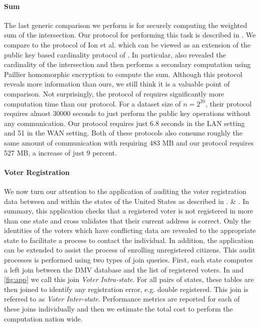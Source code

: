 \paragraph{Sum} The last generic comparison we perform is for securely computing the weighted sum of the intersection. Our protocol for performing this task is described in . We compare to the protocol of Ion et al. \cite{cryptoeprint:2017:738} which can be viewed as an extension of the public key based cardinality protocol of \cite{DBLP:conf/cans/CristofaroGT12}. In particular, \cite{cryptoeprint:2017:738}  also revealed the cardinality of the intersection and then performs a secondary computation using Paillier homomorphic encryption to compute the sum. Although this protocol reveals more information than ours, we still think it is a valuable point of comparison. Not surprisingly,  the protocol of \cite{cryptoeprint:2017:738} requires significantly more computation time than our protocol. For a dataset size of $n=2^{20}$, their protocol requires almost 30000 seconds to just perform the public key operations without any communication. Our protocol requires just 6.8 seconds in the LAN setting and 51 in the WAN setting. Both of these protocols also consume roughly the same amount of communication with \cite{cryptoeprint:2017:738} requiring 483 MB and our protocol requires 527 MB, a increase of just 9 percent. 
\fi

\paragraph{Voter Registration} We now turn our attention to the application of auditing the voter registration data between and within the states of the United States as described in 
\iffullversion
{}.
\else
{} \& . 
\fi
In summary, this application checks that a registered voter is not registered in more than one state and cross validates that their current address is correct. Only the identities of the voters which have conflicting data are revealed to the appropriate state to facilitate a process to contact the individual. In addition, the application can be extended to assist the process of enrolling unregistered citizens. This audit processes is performed using two types of join queries. First, each state computes a left join between the DMV database and the list of registered voters. In  and \ref{fig:app} we call this join \emph{Voter Intra-state}. For all pairs of states, these tables are then joined to identify any registration error, e.g. double registered. This join is referred to as \emph{Voter Inter-state}. Performance metrics are reported for each of these joins individually and then we estimate the total cost to perform the computation nation wide. 

